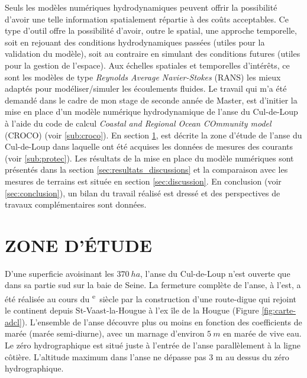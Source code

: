 \documentclass[10pt,a4paper,titlepage]{article}
\def\siecle#1{\textsc{\romannumeral #1}\textsuperscript{e}~siècle}
\begin{document}
    Seuls les modèles numériques hydrodynamiques peuvent offrir la possibilité d'avoir une telle information spatialement répartie à des coûts acceptables. Ce type d'outil offre la possibilité d'avoir, outre le spatial, une approche temporelle, soit en rejouant des conditions hydrodynamiques passées (utiles pour la validation du modèle), soit au contraire en simulant des conditions futures (utiles pour la gestion de l'espace). Aux échelles spatiales et temporelles d'intérêts, ce sont les modèles de type \textit{Reynolds Average Navier-Stokes} (RANS) les mieux adaptés pour modéliser/simuler les écoulements fluides.
    Le travail qui m'a été demandé dans le cadre de mon stage de seconde année de Master, est d'initier la mise en place d'un modèle numérique hydrodynamique de l'anse du Cul-de-Loup à l'aide du code de calcul \textit{Coastal and Regional Ocean COmmunity model} (CROCO) (voir \ref{sub:croco}). En section \ref{sec:adcl}, est décrite la zone d'étude de l'anse du Cul-de-Loup dans laquelle ont été acquises les données de mesures des courants (voir \ref{sub:protec}). Les résultats de la mise en place du modèle numériques sont présentés dans la section \ref{sec:resultats_discussions} et la comparaison avec les mesures de terrains est située en section \ref{sec:discussion}. En conclusion (voir \ref{sec:conclusion}), un bilan du travail réalisé est dressé et des perspectives de travaux complémentaires sont données.

    \newpage

    \section{ZONE D'ÉTUDE}
    \label{sec:adcl}

    D'une superficie avoisinant les $370~ha$, l'anse du Cul-de-Loup n'est ouverte que dans sa partie sud sur la baie de Seine. La fermeture complète de l'anse, à l'est, a été réalisée au cours du \siecle{17} par la construction d'une route-digue qui rejoint le continent depuis St-Vaast-la-Hougue à l'ex île de la Hougue (Figure \ref{fig:carte-adcl}). L'ensemble de l'anse découvre plus ou moins en fonction des coefficients de marée (marée semi-diurne), avec un marnage d'environ $5~m$ en marée de vive eau. Le zéro hydrographique est situé juste à l'entrée de l'anse parallèlement à la ligne côtière. L'altitude maximum dans l'anse ne dépasse pas 3 m au dessus du zéro hydrographique.
\end{document}
